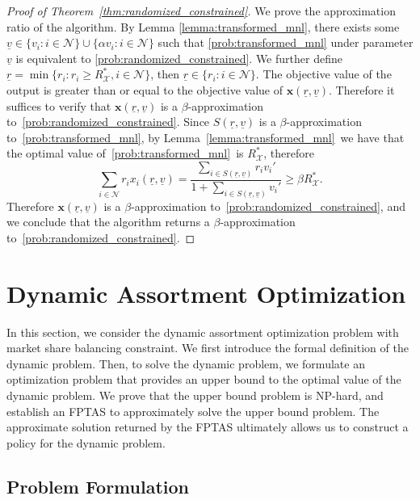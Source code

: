 \documentclass[mnsc,non-blindrev]{informs3}
\theoremstyle{definition}
\begin{document}
\begin{proof}[Proof of Theorem~\ref{thm:randomized_constrained}]
We prove the approximation ratio of the algorithm. By Lemma \ref{lemma:transformed_mnl}, there exists some \mbox{$\underline{v}\in\{v_i:i\in\mathcal{N}\}\cup\{\alpha v_i:i\in\mathcal{N}\}$} such that \ref{prob:transformed_mnl} under parameter $\underline{v}$ is equivalent to \ref{prob:randomized_constrained}. We further define $\underline{r}=\min\{r_i:r_i\geq R_{\mathcal{X}}^*,i\in\mathcal{N}\}$, then $\underline{r}\in\{r_i:i\in\mathcal{N}\}$. The objective value of the output is greater than or equal to the objective value of $\bm{x}(\underline{r},\underline{v})$. Therefore it suffices to verify that $\bm{x}(\underline{r},\underline{v})$ is a $\beta$-approximation to~\ref{prob:randomized_constrained}. Since $S(\underline{r},\underline{v})$ is a $\beta$-approximation to~\ref{prob:transformed_mnl}, by Lemma~\ref{lemma:transformed_mnl}~we have that the optimal value of~\ref{prob:transformed_mnl}~is $R^*_{\mathcal{X}}$, therefore
\begin{equation*}
\sum_{i\in\mathcal{N}}r_ix_i(\underline{r},\underline{v})=\dfrac{\sum_{i\in S(\underline{r},\underline{v})}r_iv_i'}{1+\sum_{i\in S(\underline{r},\underline{v})}v_i'}\geq \beta R^*_{\mathcal{X}}.
\end{equation*}
Therefore $\bm{x}(\underline{r},\underline{v})$ is a $\beta$-approximation to~\ref{prob:randomized_constrained}, and we conclude that the algorithm returns a $\beta$-approximation to~\ref{prob:randomized_constrained}.
\end{proof}

\section{Dynamic Assortment Optimization}\label{sec:dynamic}

In this section, we consider the dynamic assortment optimization problem with market share balancing constraint. We first introduce the formal definition of the dynamic problem. Then, to solve the dynamic problem, we formulate an optimization problem that provides an upper bound to the optimal value of the dynamic problem. We prove that the upper bound problem is NP-hard, and establish an FPTAS to approximately solve the upper bound problem. The approximate solution returned by the FPTAS ultimately allows us to construct a policy for the dynamic problem.

\subsection{Problem Formulation}
\end{document}
